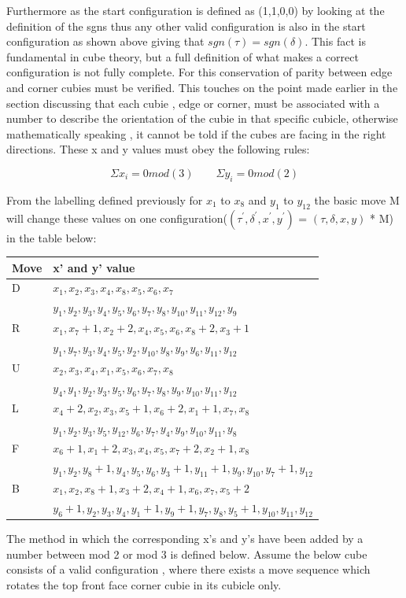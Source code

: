 \documentclass{article}
\begin{document}
Furthermore as the start configuration is defined as (1,1,0,0) by looking at the definition of the sgns thus any other valid configuration is also in the start configuration as shown above giving that $sgn(\tau) = sgn(\delta)$. 
This fact is fundamental in cube theory, but a full definition of what makes a correct configuration is not fully complete. For this conservation of parity between edge and corner cubies must be verified. This touches on the point made earlier in the section discussing that each cubie , edge or corner, must be associated with a number to describe the orientation of the cubie in that specific cubicle, otherwise mathematically speaking , it cannot be told if the cubes are facing in the right directions. These x and y values must obey the following rules: 

\begin{equation}
\Sigma x_{i} =0mod(3) \qquad \Sigma y_{i} =0mod(2) 
\end{equation}

From the labelling defined previously for $x_{1}$ to $x_{8}$ and $y_{1}$ to $y_{12}$ the basic move M will change these values on one configuration($(\tau^{'} ,\delta^{'} , x^{'} , y^{'} )$ = $(\tau,\delta, x, y)$ * M) in the table below\cite{chengroup}:

\begin{center}
\label{:paritytable}
    \begin{tabular}{ | l | p{12cm} |}
    \hline
    Move & x' and y' value \\ \hline
    D &  $x_1,x_2,x_3,x_4,x_8,x_5,x_6,x_7$ \\
& $y_1,y_2,y_3,y_4,y_5,y_6,y_7,y_8,y_{10},y_{11},y_{12},y_9$\\ \hline
    R &  $x_1,x_7 +1,x_2 +2,x_4,x_5,x_6,x_8 +2,x_3 +1$\\ & $y_1,y_7,y_3,y_4,y_5,y_2,y_{10},y_{8},y_{9},y_{6},y_{11},y_{12}$\\ \hline
    U &  $x_2,x_3,x_4,x_1,x_5,x_6,x_7,x_8$ \\ & $y_4,y_1,y_2,y_3,y_5,y_6,y_{7},y_{8},y_{9},y_{10},y_{11},y_{12}$\\ \hline
    L & $x_4 +2,x_2,x_3,x_5 + 1,x_6 +2,x_1 + 1,x_7,x_8$ \\
& $y_1,y_2,y_3,y_5,y_12,y_6,y_{7},y_{4},y_{9},y_{10},y_{11},y_{8}$\\ \hline
    F &  $x_6 +1,x_1 +2,x_3,x_4,x_5,x_7 +2,x_2 +1,x_8$\\
& $y_1,y_2,y_8 +1,y_4,y_5,y_6,y_{3}+1,y_{11}+1,y_{9},y_{10},y_{7}+1,y_{12}$\\ \hline
    B &  $x_1,x_2,x_8 +1,x_3 + 2,x_4 + 1,x_6,x_7,x_5 +2$ \\
&$y_6 +1,y_2,y_3,y_4,y_1 +1,y_9 +1,y_{7},y_{8},y_{5}+1,y_{10},y_{11},y_{12}$\\ \hline
    \end{tabular}
\end{center}
The method in which the corresponding x's and y's have been added by a number between mod 2 or mod 3 is defined below. Assume the below cube consists of a valid configuration , where there exists a move sequence which rotates the top front face corner cubie in its cubicle only. 
\end{document}

